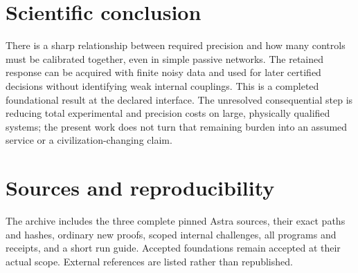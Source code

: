\documentclass[10pt,a4paper]{article}
\begin{document}
\section*{Scientific conclusion}

There is a sharp relationship between required precision and how many controls
must be calibrated together, even in simple passive networks. The retained
response can be acquired with finite noisy data and used for later certified
decisions without identifying weak internal couplings. This is a completed
foundational result at the declared interface. The unresolved consequential
step is reducing total experimental and precision costs on large, physically
qualified systems; the present work does not turn that remaining burden into
an assumed service or a civilization-changing claim.

\section*{Sources and reproducibility}
The archive includes the three complete pinned Astra sources, their exact
paths and hashes, ordinary new proofs, scoped internal challenges, all programs
and receipts, and a short run guide. Accepted foundations remain accepted at
their actual scope. External references are listed rather than republished.
\end{document}
